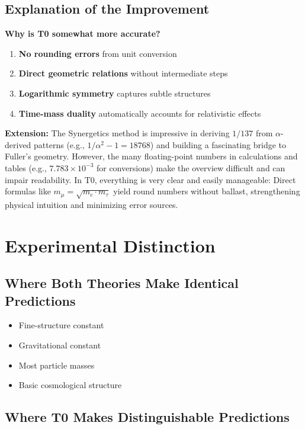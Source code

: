 	\subsection{Explanation of the Improvement}
	
	\textbf{Why is T0 somewhat more accurate?}
	
	\begin{enumerate}
		\item \textbf{No rounding errors} from unit conversion
		\item \textbf{Direct geometric relations} without intermediate steps
		\item \textbf{Logarithmic symmetry} captures subtle structures
		\item \textbf{Time-mass duality} automatically accounts for relativistic effects
	\end{enumerate}
	
	\textbf{Extension:} The Synergetics method is impressive in deriving $1/137$ from $\alpha$-derived patterns (e.g., $1/\alpha^2 - 1 = 18768$) and building a fascinating bridge to Fuller's geometry. However, the many floating-point numbers in calculations and tables (e.g., $7.783 \times 10^{-3}$ for conversions) make the overview difficult and can impair readability. In T0, everything is very clear and easily manageable: Direct formulas like $m_\mu = \sqrt{m_e \cdot m_\tau}$ yield round numbers without ballast, strengthening physical intuition and minimizing error sources.
	
	\section{Experimental Distinction}
	
	\subsection{Where Both Theories Make Identical Predictions}
	
	\begin{itemize}
		\item Fine-structure constant
		\item Gravitational constant
		\item Most particle masses
		\item Basic cosmological structure
	\end{itemize}
	
	\subsection{Where T0 Makes Distinguishable Predictions}
	
